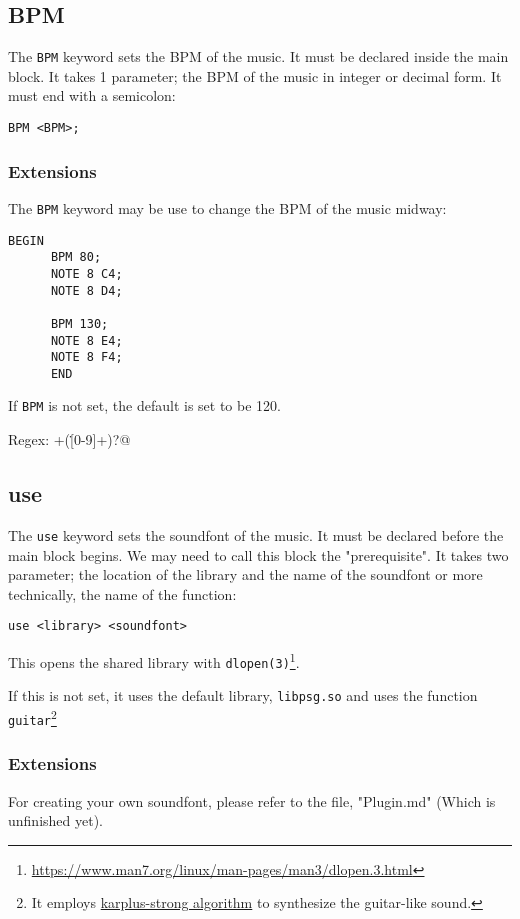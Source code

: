 \documentclass{article}
\begin{document}
\subsection{BPM}

The \verb+BPM+ keyword sets the BPM of the music. It must be declared inside the main block.
It takes 1 parameter; the BPM of the music in integer or decimal form. It must end
with a semicolon:
\begin{Verbatim}[frame=single]
      BPM <BPM>;
\end{Verbatim}

\subsubsection{Extensions}

The \verb+BPM+ keyword may be use to change the BPM of the music midway:
\begin{Verbatim}[frame=single]
      BEGIN
      BPM 80;
      NOTE 8 C4;
      NOTE 8 D4;

      BPM 130;
      NOTE 8 E4;
      NOTE 8 F4;
      END
\end{Verbatim}

If \verb+BPM+ is not set, the default is set to be 120.

Regex: \verb@[0-9]+(\.[0-9]+)?@
\subsection{use}

The \verb+use+ keyword sets the soundfont of the music. It must be declared before the main block begins.
We may need to call this block the "prerequisite".
It takes two parameter; the location of the library and the name of the soundfont
or more technically, the name of the function:
\begin{Verbatim}[frame=single]
      use <library> <soundfont>
\end{Verbatim}

This opens the shared library with \verb+dlopen(3)+\footnote{\url{https://www.man7.org/linux/man-pages/man3/dlopen.3.html}}.

If this is not set, it uses the default library, \verb+libpsg.so+ and uses the function \verb+guitar+\footnote{It employs \href{wikipedia.org/wiki/Karplus\%E2\%80\%93Strong_string_synthesis}{karplus-strong algorithm} to synthesize the guitar-like sound.}

\subsubsection{Extensions}
For creating your own soundfont, please refer to the file, "Plugin.md" (Which is unfinished yet).
\end{document}
